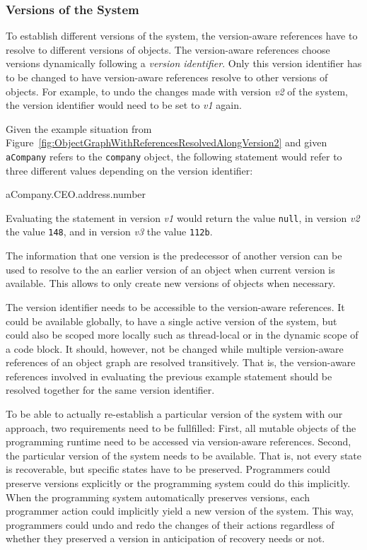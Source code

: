 \subsubsection{Versions of the System}

To establish different versions of the system, the version-aware references have to resolve to different versions of objects.
The version-aware references choose versions dynamically following a \emph{version identifier}.
Only this version identifier has to be changed to have version-aware references resolve to other versions of objects.
For example, to undo the changes made with version \emph{v2} of the system, the version identifier would need to be set to \emph{v1} again.

Given the example situation from Figure~\ref{fig:ObjectGraphWithReferencesResolvedAlongVersion2} and given \lstinline{aCompany} refers to the \lstinline{company} object, the following statement would refer to three different values depending on the version identifier:

\begin{code}{}{}
aCompany.CEO.address.number
\end{code}
\iffalse
\end{verbatim}\fi

Evaluating the statement in version \emph{v1} would return the value \lstinline{null}, in version \emph{v2} the value \lstinline{148}, and in version \emph{v3} the value \lstinline{112b}.

The information that one version is the predecessor of another version can be used to resolve to the an earlier version of an object when current version is available.
This allows to only create new versions of objects when necessary.

The version identifier needs to be accessible to the version-aware references.
It could be available globally, to have a single active version of the system, but could also be scoped more locally such as thread-local or in the dynamic scope of a code block.
It should, however, not be changed while multiple version-aware references of an object graph are resolved transitively.
That is, the version-aware references involved in evaluating the previous example statement should be resolved together for the same version identifier.

To be able to actually re-establish a particular version of the system with our approach, two requirements need to be fullfilled:
First, all mutable objects of the programming runtime need to be accessed via version-aware references.
Second, the particular version of the system needs to be available.
That is, not every state is recoverable, but specific states have to be preserved.
Programmers could preserve versions explicitly or the programming system could do this implicitly.
When the programming system automatically preserves versions, each programmer action could implicitly yield a new version of the system.
This way, programmers could undo and redo the changes of their actions regardless of whether they preserved a version in anticipation of recovery needs or not.

